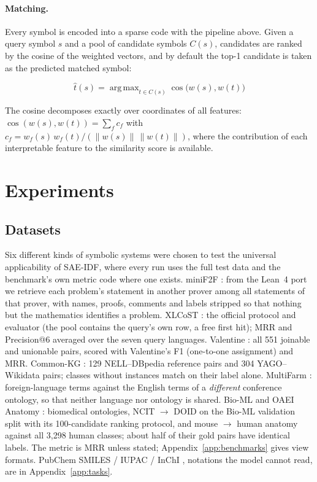 \documentclass[11pt]{article}
\newcommand{\method}{SAE\mbox{-}IDF\xspace}
\DeclareMathOperator*{\argmax}{arg\,max}
\begin{document}
\paragraph{Matching.}
Every symbol is encoded into a sparse code with the pipeline above. Given a query symbol $s$ and a pool of candidate symbols $C(s)$, candidates are ranked by the cosine of the weighted vectors, and by default the top-1 candidate is taken as the predicted matched symbol: 

\begin{equation}
    \hat t(s)=\argmax_{t\in C(s)}\cos\big(w(s),w(t)\big)
\end{equation}

The cosine decomposes exactly over coordinates of all features: $\cos(w(s),w(t))=\sum_f c_f$ with $c_f=w_f(s)\,w_f(t)/(\|w(s)\|\,\|w(t)\|)$, where the contribution of each interpretable feature to the similarity score is available.

\section{Experiments}
\label{sec:experiments}

\subsection{Datasets}
\label{sec:datasets}

Six different kinds of symbolic systems were chosen to test the universal applicability of \method, where every run uses the full test data and the benchmark's own metric code where one exists.
miniF2F \citep{zheng2022minif2f}: from the Lean~4 port \citep{yang2023minif2flean4} we retrieve each problem's statement in another prover among all statements of that prover, with names, proofs, comments and labels stripped so that nothing but the mathematics identifies a problem.
XLCoST \citep{zhu2022xlcost}: the official protocol and evaluator (the pool contains the query's own row, a free first hit); MRR and Precision@6 averaged over the seven query languages.
Valentine \citep{koutras2021valentine}: all 551 joinable and unionable pairs, scored with Valentine's F1 (one-to-one assignment) and MRR.
Common-KG \citep{fallatah2020gold}: 129 NELL--DBpedia reference pairs and 304 YAGO--Wikidata pairs; classes without instances match on their label alone.
MultiFarm \citep{meilicke2012multifarm}: foreign-language terms against the English terms of a \emph{different} conference ontology, so that neither language nor ontology is shared.
Bio-ML \citep{he2022bioml} and OAEI Anatomy \citep{bodenreider2005mice}: biomedical ontologies, NCIT $\to$ DOID on the Bio-ML validation split with its 100-candidate ranking protocol, and mouse $\to$ human anatomy against all 3,298 human classes; about half of their gold pairs have identical labels.
The metric is MRR unless stated; Appendix~\ref{app:benchmarks} gives view formats.
PubChem SMILES / IUPAC / InChI \citep{kim2023pubchem}, notations the model cannot read, are in Appendix~\ref{app:tasks}.
\end{document}

